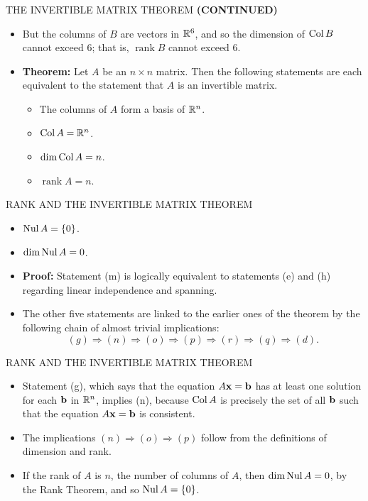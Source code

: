 \begin{frame}[shrink=9]{THE INVERTIBLE MATRIX THEOREM}
\textbf{(CONTINUED)}
\begin{itemize}
\item But the columns of $B$ are vectors in $\mathbb{R}^6$, and so the dimension of $\operatorname{Col} B$ cannot exceed 6; that is, $\operatorname{rank}B$ cannot exceed 6.
\item \textbf{Theorem:} Let $A$ be an $n\times n$ matrix. Then the following statements are each equivalent to the statement that $A$ is an invertible matrix.
\begin{itemize}
\item[m.] The columns of $A$ form a basis of $\mathbb{R}^n$.
\item[n.] $\operatorname{Col} A=\mathbb{R}^n$.
\item[o.] $\dim\operatorname{Col} A=n$.
\item[p.] $\operatorname{rank}A=n$.
\end{itemize}
\end{itemize}
\end{frame}

\begin{frame}[shrink=8]{RANK AND THE INVERTIBLE MATRIX THEOREM}
\begin{itemize}
\item[q.] $\operatorname{Nul} A=\{0\}$.
\item[r.] $\dim\operatorname{Nul} A=0$.
\item \textbf{Proof:} Statement (m) is logically equivalent to statements (e) and (h) regarding linear independence and spanning.
\item The other five statements are linked to the earlier ones of the theorem by the following chain of almost trivial implications:
\[
(g)\Rightarrow(n)\Rightarrow(o)\Rightarrow(p)\Rightarrow(r)\Rightarrow(q)\Rightarrow(d).
\]
\end{itemize}
\end{frame}

\begin{frame}[shrink=9]{RANK AND THE INVERTIBLE MATRIX THEOREM}
\begin{itemize}
\item Statement (g), which says that the equation $A\mathbf{x}=\mathbf{b}$ has at least one solution for each $\mathbf{b}$ in $\mathbb{R}^n$, implies (n), because $\operatorname{Col} A$ is precisely the set of all $\mathbf{b}$ such that the equation $A\mathbf{x}=\mathbf{b}$ is consistent.
\item The implications $(n)\Rightarrow(o)\Rightarrow(p)$ follow from the definitions of dimension and rank.
\item If the rank of $A$ is $n$, the number of columns of $A$, then $\dim\operatorname{Nul} A=0$, by the Rank Theorem, and so $\operatorname{Nul} A=\{0\}$.
\end{itemize}
\end{frame}

